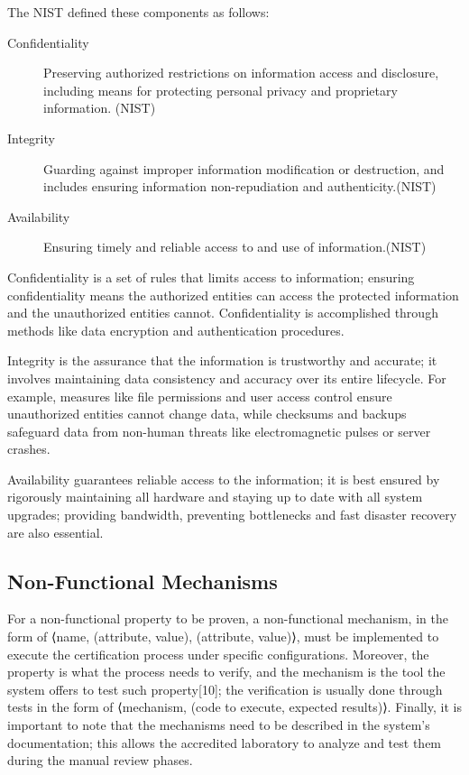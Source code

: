 The NIST defined these components as follows:
\begin{description}
    \item[Confidentiality] Preserving authorized restrictions on information access and disclosure, including means for protecting personal privacy and proprietary information. (NIST)
    \item[Integrity] Guarding against improper information modification or destruction, and includes ensuring information non-repudiation and authenticity.(NIST)
    \item[Availability] Ensuring timely and reliable access to and use of information.(NIST)

\end{description}

Confidentiality is a set of rules that limits access to information; ensuring confidentiality means the authorized entities can access the protected information and the unauthorized entities cannot. Confidentiality is accomplished through methods like data encryption and authentication procedures.

Integrity is the assurance that the information is trustworthy and accurate; it involves maintaining data consistency and accuracy over its entire lifecycle. For example, measures like file permissions and user access control ensure unauthorized entities cannot change data, while checksums and backups safeguard data from non-human threats like electromagnetic pulses or server crashes.

Availability guarantees reliable access to the information; it is best ensured by rigorously maintaining all hardware and staying up to date with all system upgrades; providing bandwidth, preventing bottlenecks and fast disaster recovery are also essential.



\subsection{Non-Functional Mechanisms}
For a non-functional property to be proven, a non-functional mechanism, in the form of ⟨name, {(attribute, value), (attribute, value)}⟩, must be implemented to execute the certification process under specific configurations. Moreover, the property is what the process needs to verify, and the mechanism is the tool the system offers to test such property[10]; the verification is usually done through tests in the form of ⟨mechanism, (code to execute, expected results)⟩. Finally, it is important to note that the mechanisms need to be described in the system's documentation; this allows the accredited laboratory to analyze and test them during the manual review phases.



